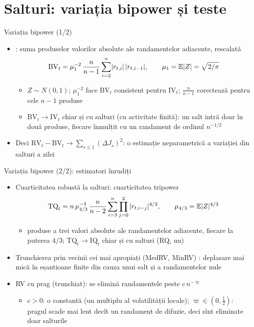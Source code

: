 \section{Salturi: variația bipower și teste}

\begin{frame}{Variația bipower (1/2)}
\itemsize{\small}
\begin{itemize}
    \item {}: suma produselor valorilor absolute ale randamentelor adiacente, rescalată
    \[ \mathrm{BV}_t = \mu_1^{-2}\,\frac{n}{n-1}\sum_{i=2}^n\lvert r_{t,i}\rvert\,\lvert r_{t,i-1}\rvert, \qquad \mu_1 = \mathbb{E}|Z| = \sqrt{2/\pi} \]
    \begin{itemize}
        \item $Z \sim N(0, 1)$; $\mu_1^{-2}$ face $\mathrm{BV}_t$ consistent pentru $\mathrm{IV}_t$; $\frac{n}{n-1}$ corectează pentru cele $n-1$ produse
        \item $\mathrm{BV}_t \to \mathrm{IV}_t$ chiar și cu salturi (cu activitate finită): un salt intră doar în două produse, fiecare înmulțit cu un randament de ordinul $n^{-1/2}$
    \end{itemize}
    \item Deci $\mathrm{RV}_t - \mathrm{BV}_t \to \sum_{s \le 1}(\Delta J_s)^2$: o estimație neparametrică a variației din salturi a zilei
\end{itemize}
\end{frame}

\begin{frame}{Variația bipower (2/2): estimatori înrudiți}
\itemsize{\small}
\begin{itemize}
    \item Cuarticitatea robustă la salturi: cuarticitatea tripower
    \[ \mathrm{TQ}_t = n\,\mu_{4/3}^{-3}\,\frac{n}{n-2}\sum_{i=3}^n\prod_{j=0}^2|r_{t,i-j}|^{4/3}, \qquad \mu_{4/3} = \mathbb{E}|Z|^{4/3} \]
    \begin{itemize}
        \item produse a trei valori absolute ale randamentelor adiacente, fiecare la puterea $4/3$; $\mathrm{TQ}_t \to \mathrm{IQ}_t$ chiar și cu salturi (RQ, nu)
    \end{itemize}
    \item Trunchierea prin vecinii cei mai apropiați (MedRV, MinRV) : deplasare mai mică în eșantioane finite din cauza unui salt și a randamentelor nule
    \item RV cu prag (trunchiat): se elimină randamentele peste $c\,n^{-\varpi}$
    \begin{itemize}
        \item $c > 0$: o constantă (un multiplu al volatilității locale); $\varpi \in (0, \frac12)$: pragul scade mai lent decît un randament de difuzie, deci sînt eliminate doar salturile
    \end{itemize}
\end{itemize}
\end{frame}

